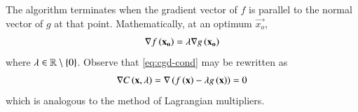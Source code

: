 \documentclass[journal,12pt,twocolumn]{IEEEtran}
\begin{document}
The algorithm terminates when the gradient vector of $f$ is parallel to the normal 
vector of $g$ at that point. Mathematically, at an optimum $\vec{x_o}$,
\begin{align}
    \nabla f\left(\mathbf{x_o}\right) = \lambda\nabla g\left(\mathbf{x_o}\right)
    \label{eq:cgd-cond}
\end{align}
where $\lambda \in \mathbb{R}\setminus\left\{0\right\}$. Observe that \eqref{eq:cgd-cond}
may be rewritten as
\begin{align}
    \nabla C\left(\mathbf{x},\lambda\right) = \nabla \left(f\left(\mathbf{x}\right)-\lambda g\left(\mathbf{x}\right)\right) = 0
\end{align}
which is analogous to the method of Lagrangian multipliers.
\end{document}
